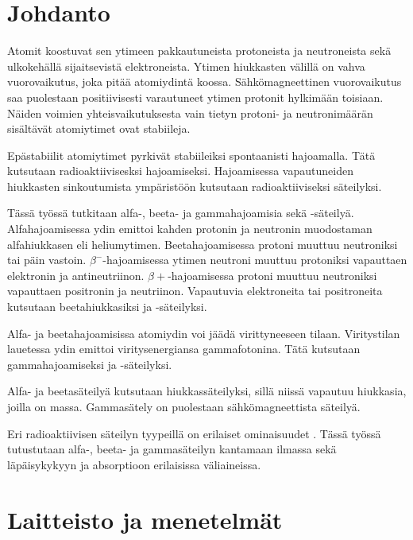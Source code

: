 \documentclass[a4paper,11pt]{article}
\begin{document}
\section{Johdanto}

Atomit koostuvat sen ytimeen pakkautuneista protoneista ja neutroneista sekä ulkokehällä sijaitsevistä elektroneista. Ytimen hiukkasten välillä on vahva vuorovaikutus, joka pitää atomiydintä koossa. Sähkömagneettinen vuorovaikutus saa puolestaan positiivisesti varautuneet ytimen protonit hylkimään toisiaan. Näiden voimien yhteisvaikutuksesta vain tietyn protoni- ja neutronimäärän sisältävät atomiytimet ovat stabiileja. \cite{ohje, wiki:radioaktiivisuus}

Epästabiilit atomiytimet pyrkivät stabiileiksi spontaanisti hajoamalla. Tätä kutsutaan radioaktiivisesksi hajoamiseksi. Hajoamisessa vapautuneiden hiukkasten sinkoutumista ympäristöön kutsutaan radioaktiiviseksi säteilyksi. \cite{ohje, wiki:radioaktiivisuus}

Tässä työssä tutkitaan alfa-, beeta- ja gammahajoamisia sekä -säteilyä. Alfahajoamisessa ydin emittoi kahden protonin ja neutronin muodostaman alfahiukkasen eli heliumytimen. Beetahajoamisessa protoni muuttuu neutroniksi tai päin vastoin. $\beta^-$-hajoamisessa ytimen neutroni muuttuu protoniksi vapauttaen elektronin ja antineutriinon. $\beta+$-hajoamisessa protoni muuttuu neutroniksi vapauttaen positronin ja neutriinon. Vapautuvia elektroneita tai positroneita kutsutaan beetahiukkasiksi ja -säteilyksi. \cite{ohje, wiki:radioaktiivisuus}

Alfa- ja beetahajoamisissa atomiydin voi jäädä virittyneeseen tilaan. Viritystilan lauetessa ydin emittoi viritysenergiansa gammafotonina. Tätä kutsutaan gammahajoamiseksi ja -säteilyksi. \cite{ohje, wiki:radioaktiivisuus}

Alfa- ja beetasäteilyä kutsutaan hiukkassäteilyksi, sillä niissä vapautuu hiukkasia, joilla on massa. Gammasätely on puolestaan sähkömagneettista säteilyä. \cite{ohje, wiki:radioaktiivisuus}

Eri radioaktiivisen säteilyn tyypeillä on erilaiset ominaisuudet \cite{ohje, wiki:radioaktiivisuus}. Tässä työssä tutustutaan alfa-, beeta- ja gammasäteilyn kantamaan ilmassa sekä läpäisykykyyn ja absorptioon erilaisissa väliaineissa. 

\section{Laitteisto ja menetelmät}
\end{document}
